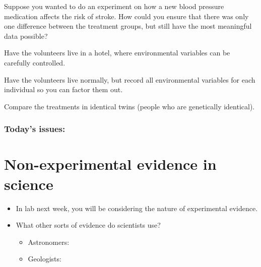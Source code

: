 \begin{noheadline}
\begin{frame}
    \begin{clickerquestion}
        \item Suppose you wanted to do an experiment on how a new
            blood pressure medication affects the risk of stroke. How
            could you ensure that there was only one difference between
            the treatment groups, but still have the most meaningful data
            possible? 
        \begin{clickeroptions}
            \item {}
            \item Have the volunteers live in a hotel, where
                environmental variables can be carefully controlled. 
            \item Have the volunteers live normally, but record all
                environmental variables for each individual so you can
                factor them out. 
            \item Compare the treatments in identical twins (people
                who are genetically identical). 
        \end{clickeroptions}
    \end{clickerquestion}
\end{frame}
\end{noheadline}

\begin{noheadline}
\begin{frame}
\frametitle{Today's issues:}
\tableofcontents
\end{frame}
\end{noheadline}


\section{Non-experimental evidence in science}

\begin{frame}
    \begin{itemize}
        \item<1-> In lab next week, you will be considering the nature of
            experimental evidence.
        \item<2-> What other sorts of evidence do scientists use? 
        \begin{itemize}
            \item Astronomers:
            \item Geologists:
        \end{itemize}
    \end{itemize}
\end{frame}


